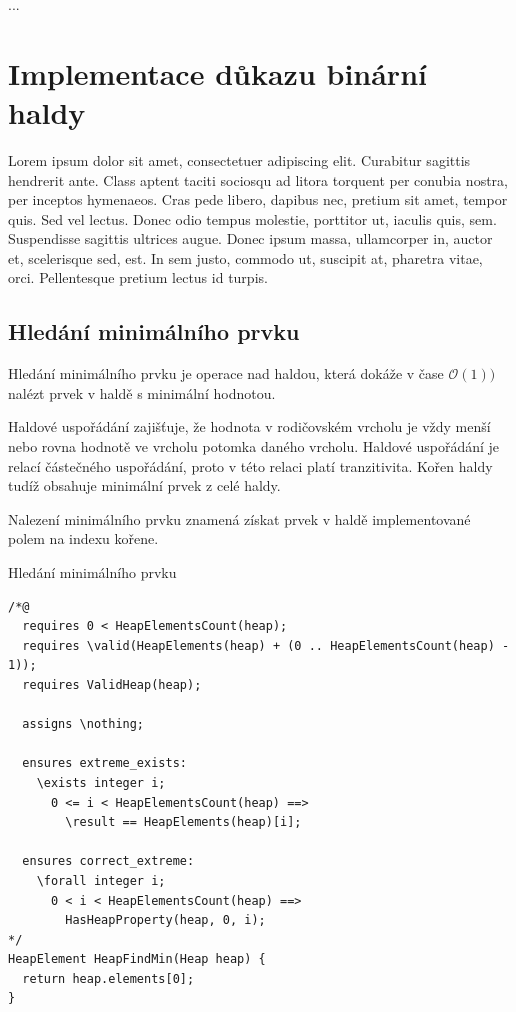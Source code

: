 \begin{definition}
...
\end{definition}


\chapter{Implementace důkazu binární haldy}

Lorem ipsum dolor sit amet, consectetuer adipiscing elit. Curabitur sagittis hendrerit ante. Class aptent taciti sociosqu ad litora torquent per conubia nostra, per inceptos hymenaeos. Cras pede libero, dapibus nec, pretium sit amet, tempor quis. Sed vel lectus. Donec odio tempus molestie, porttitor ut, iaculis quis, sem. Suspendisse sagittis ultrices augue. Donec ipsum massa, ullamcorper in, auctor et, scelerisque sed, est. In sem justo, commodo ut, suscipit at, pharetra vitae, orci. Pellentesque pretium lectus id turpis.

\section{Hledání minimálního prvku}
\label{subsec:HeapFindMin}

Hledání minimálního prvku je operace nad haldou, která dokáže v čase $\mathcal{O}(1))$ nalézt prvek v haldě s minimální hodnotou.

Haldové uspořádání zajišťuje, že hodnota v rodičovském vrcholu je vždy menší nebo rovna hodnotě ve vrcholu potomka daného vrcholu. Haldové uspořádání je relací částečného uspořádání, proto v této relaci platí tranzitivita. Kořen haldy tudíž obsahuje minimální prvek z celé haldy.

Nalezení minimálního prvku znamená získat prvek v haldě implementované polem na indexu kořene.

\begin{listing}[H]
	\caption{Hledání minimálního prvku}
	\label{list:HeapFindMin}
	\begin{verbatim}
/*@
  requires 0 < HeapElementsCount(heap);
  requires \valid(HeapElements(heap) + (0 .. HeapElementsCount(heap) - 1));
  requires ValidHeap(heap);

  assigns \nothing;

  ensures extreme_exists:
    \exists integer i;
      0 <= i < HeapElementsCount(heap) ==>
        \result == HeapElements(heap)[i];

  ensures correct_extreme:
    \forall integer i;
      0 < i < HeapElementsCount(heap) ==>
        HasHeapProperty(heap, 0, i);
*/
HeapElement HeapFindMin(Heap heap) {
  return heap.elements[0];
}
	\end{verbatim}
\end{listing}

